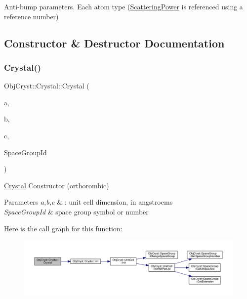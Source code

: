 Anti-\/bump parameters. Each atom type (\mbox{\hyperlink{class_obj_cryst_1_1_scattering_power}{Scattering\+Power}} is referenced using a reference number) 

\subsection{Constructor \& Destructor Documentation}
\mbox{\label{class_obj_cryst_1_1_crystal_af4476f2fa29985667c19dc14dcc1efc9}} 
\subsubsection{\texorpdfstring{Crystal()}{Crystal()}\hspace{0.1cm}{\footnotesize\ttfamily [1/2]}}
{\footnotesize\ttfamily Obj\+Cryst\+::\+Crystal\+::\+Crystal (\begin{DoxyParamCaption}\item[{const R\+E\+AL}]{a,  }\item[{const R\+E\+AL}]{b,  }\item[{const R\+E\+AL}]{c,  }\item[{const string \&}]{Space\+Group\+Id }\end{DoxyParamCaption})}



\mbox{\hyperlink{class_obj_cryst_1_1_crystal}{Crystal}} Constructor (orthorombic) 


\begin{DoxyParams}{Parameters}
{\em a,b,c} & \+: unit cell dimension, in angstroems \\
\hline
{\em Space\+Group\+Id} & space group symbol or number \\
\hline
\end{DoxyParams}
Here is the call graph for this function\+:
\nopagebreak
\begin{figure}[H]
\begin{center}
\leavevmode
\includegraphics[width=350pt]{class_obj_cryst_1_1_crystal_af4476f2fa29985667c19dc14dcc1efc9_cgraph}
\end{center}
\end{figure}
\mbox{\label{class_obj_cryst_1_1_crystal_a5bb224d9b91463fb5748d76a2bcd6949}} 
